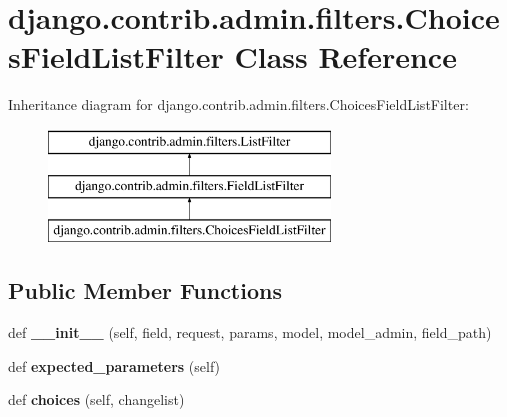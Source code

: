 \hypertarget{classdjango_1_1contrib_1_1admin_1_1filters_1_1_choices_field_list_filter}{}\section{django.\+contrib.\+admin.\+filters.\+Choices\+Field\+List\+Filter Class Reference}
\label{classdjango_1_1contrib_1_1admin_1_1filters_1_1_choices_field_list_filter}
Inheritance diagram for django.\+contrib.\+admin.\+filters.\+Choices\+Field\+List\+Filter\+:\begin{figure}[H]
\begin{center}
\leavevmode
\includegraphics[height=3.000000cm]{classdjango_1_1contrib_1_1admin_1_1filters_1_1_choices_field_list_filter}
\end{center}
\end{figure}
\subsection*{Public Member Functions}
\begin{DoxyCompactItemize}
\item 
\mbox{\label{classdjango_1_1contrib_1_1admin_1_1filters_1_1_choices_field_list_filter_a117fa774f46c6f3ee79a490dd5428d22}} 
def {\bfseries \+\_\+\+\_\+init\+\_\+\+\_\+} (self, field, request, params, model, model\+\_\+admin, field\+\_\+path)
\item 
\mbox{\label{classdjango_1_1contrib_1_1admin_1_1filters_1_1_choices_field_list_filter_aba2f3cb2e25376f2573a057a0793188d}} 
def {\bfseries expected\+\_\+parameters} (self)
\item 
\mbox{\label{classdjango_1_1contrib_1_1admin_1_1filters_1_1_choices_field_list_filter_abee6d703710ea50cc5845b7eca80dffe}} 
def {\bfseries choices} (self, changelist)
\end{DoxyCompactItemize}
